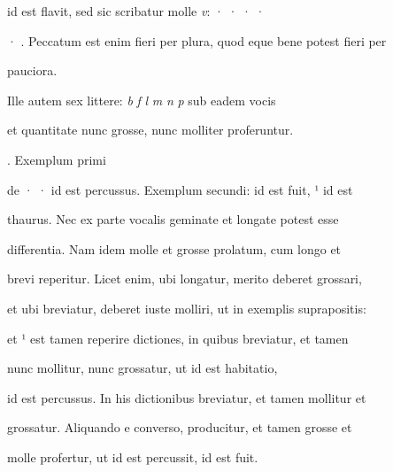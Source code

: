 id est flavit, sed sic scribatur molle \textit{v}: · · · ·

· . Peccatum est enim fieri per plura, quod eque bene potest fieri per

\splitlines

pauciora.

\indentK Ille autem sex littere: \textit{b} \textit{f} \textit{l} \textit{m} \textit{n} \textit{p} sub eadem vocis 


\newsplitline

 et quantitate nunc grosse, nunc molliter proferuntur.

\indentK {}. Exemplum primi

\fulllines


de · ·  id est percussus. Exemplum secundi:   id est fuit, ¹ id est

thaurus. Nec ex parte vocalis geminate et longate potest esse

differentia. Nam idem  molle et grosse prolatum, cum  longo et 

brevi reperitur. Licet enim, ubi  longatur, merito  deberet grossari,

et ubi  breviatur, deberet iuste molliri, ut in exemplis suprapositis:


 et ¹ est tamen reperire dictiones, in quibus  breviatur, et tamen 

nunc mollitur, nunc grossatur, ut  id est habitatio, 

id est percussus. In his dictionibus  breviatur, et tamen  mollitur et

grossatur. Aliquando e converso,  producitur, et tamen  grosse et

\splitlines

molle profertur, ut  id est percussit,   id est fuit.

